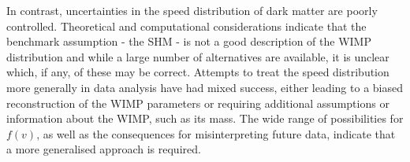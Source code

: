 In contrast, uncertainties in the speed distribution of dark matter are poorly controlled. Theoretical and computational considerations indicate that the benchmark assumption - the SHM - is not a good description of the WIMP distribution and while a large number of alternatives are available, it is unclear which, if any, of these may be correct. Attempts to treat the speed distribution more generally in data analysis have had mixed success, either leading to a biased reconstruction of the WIMP parameters or requiring additional assumptions or information about the WIMP, such as its mass. The wide range of possibilities for $f(v)$, as well as the consequences for misinterpreting future data, indicate that a more generalised approach is required.

